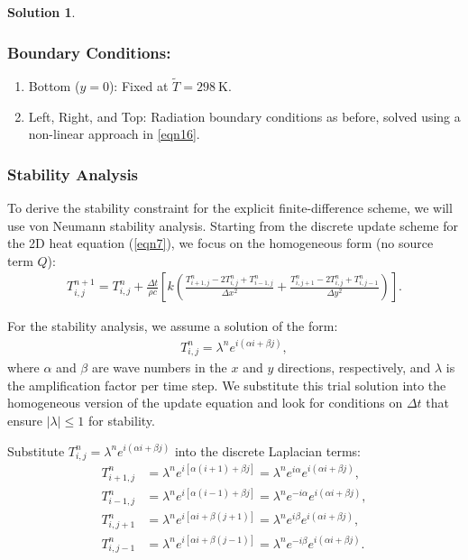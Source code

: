 \documentclass[12pt]{article}
\theoremstyle{definition} %
\newtheorem{solution}{Solution}
\theoremstyle{plain} %
\begin{document}
\begin{solution}
            \subsubsection*{Boundary Conditions:}  
            \begin{enumerate}
            \item Bottom ($y=0$): Fixed at $\tilde{T}=298\ \text{K}$.  
            \item Left, Right, and Top: Radiation boundary conditions as before, solved using a non-linear approach in \autoref{eqn16}.
            \end{enumerate}
        
            \subsubsection*{Stability Analysis}  
            \noindent To derive the stability constraint for the explicit finite-difference scheme, we will use von Neumann stability analysis. Starting from the discrete update scheme for the 2D heat equation (\autoref{eqn7}), we focus on the homogeneous form (no source term $Q$):
\begin{align}
T_{i,j}^{n+1} = T_{i,j}^n + \frac{\Delta t}{\rho c}\left[ k \left( \frac{T_{i+1,j}^n - 2T_{i,j}^n + T_{i-1,j}^n}{\Delta x^2} + \frac{T_{i,j+1}^n - 2T_{i,j}^n + T_{i,j-1}^n}{\Delta y^2}\right) \right].
\end{align}

\noindent For the stability analysis, we assume a solution of the form:
\begin{align}
T_{i,j}^n = \lambda^n e^{i(\alpha i + \beta j)},
\end{align}
where $\alpha$ and $\beta$ are wave numbers in the $x$ and $y$ directions, respectively, and $\lambda$ is the amplification factor per time step. We substitute this trial solution into the homogeneous version of the update equation and look for conditions on $\Delta t$ that ensure $|\lambda| \leq 1$ for stability.

\noindent Substitute $T_{i,j}^n = \lambda^n e^{i(\alpha i + \beta j)}$ into the discrete Laplacian terms:
\begin{align}
T_{i+1,j}^n &= \lambda^n e^{i[\alpha(i+1) + \beta j]} = \lambda^n e^{i\alpha}e^{i(\alpha i + \beta j)}, \\
T_{i-1,j}^n &= \lambda^n e^{i[\alpha(i-1) + \beta j]} = \lambda^n e^{-i\alpha}e^{i(\alpha i + \beta j)}, \\
T_{i,j+1}^n &= \lambda^n e^{i[\alpha i + \beta (j+1)]} = \lambda^n e^{i\beta}e^{i(\alpha i + \beta j)}, \\
T_{i,j-1}^n &= \lambda^n e^{i[\alpha i + \beta (j-1)]} = \lambda^n e^{-i\beta}e^{i(\alpha i + \beta j)}.
\end{align}


\end{solution}
\end{document}
